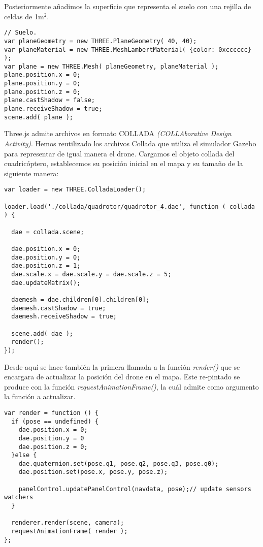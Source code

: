 Posteriormente añadimos la superficie que representa el suelo con una rejilla de celdas de 1m$^{2}$.\\

\begin{lstlisting}[caption=Superficie que representa el suelo del mapa.]
// Suelo. 
var planeGeometry = new THREE.PlaneGeometry( 40, 40);
var planeMaterial = new THREE.MeshLambertMaterial( {color: 0xcccccc} );
var plane = new THREE.Mesh( planeGeometry, planeMaterial );
plane.position.x = 0;
plane.position.y = 0;
plane.position.z = 0;
plane.castShadow = false;
plane.receiveShadow = true;
scene.add( plane );
\end{lstlisting}

Three.js admite archivos en formato COLLADA \emph{(COLLAborative Design Activity)}. Hemos reutilizado los archivos Collada que utiliza el simulador Gazebo para representar de igual manera el drone. Cargamos el objeto collada del cuadricóptero, establecemos su posición inicial en el mapa y su tamaño de la siguiente manera:\\

\begin{lstlisting}[caption=Carga del objeto collada.]
var loader = new THREE.ColladaLoader();

loader.load('./collada/quadrotor/quadrotor_4.dae', function ( collada ) {
  
  dae = collada.scene;
  
  dae.position.x = 0;
  dae.position.y = 0;
  dae.position.z = 1;
  dae.scale.x = dae.scale.y = dae.scale.z = 5;
  dae.updateMatrix();
   
  daemesh = dae.children[0].children[0];
  daemesh.castShadow = true;
  daemesh.receiveShadow = true;
      
  scene.add( dae );
  render();
});
\end{lstlisting}

Desde aquí se hace también la primera llamada a la función \emph{render()} que se encargara de actualizar la posición del drone en el mapa. Este re-pintado se produce con la función \emph{requestAnimationFrame()}, la cuál admite como argumento la función a actualizar.

\begin{lstlisting}[caption=Actualización del lienzo.]
var render = function () {
  if (pose == undefined) {
    dae.position.x = 0;
    dae.position.y = 0
    dae.position.z = 0;
  }else {
    dae.quaternion.set(pose.q1, pose.q2, pose.q3, pose.q0);
    dae.position.set(pose.x, pose.y, pose.z);
      
    panelControl.updatePanelControl(navdata, pose);// update sensors watchers
  }

  renderer.render(scene, camera);
  requestAnimationFrame( render );
};
\end{lstlisting}

